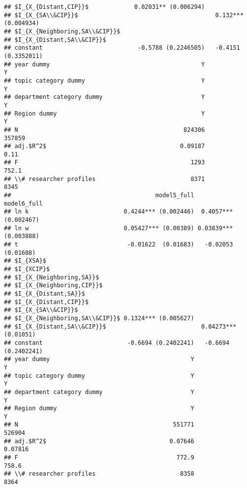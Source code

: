 \documentclass[
]{article}
\begin{document}
\begin{verbatim}
## $I_{X_{Distant,CIP}}$             0.02031** (0.006294)                      
## $I_{X_{SA\\&CIP}}$                                       0.132*** (0.004934)
## $I_{X_{Neighboring,SA\\&CIP}}$                                              
## $I_{X_{Distant,SA\\&CIP}}$                                                  
## constant                           -0.5788 (0.2246505)   -0.4151 (0.3352011)
## year dummy                                           Y                     Y
## topic category dummy                                 Y                     Y
## department category dummy                            Y                     Y
## Region dummy                                         Y                     Y
## N                                               824306                357859
## adj.$R^2$                                      0.09187                  0.11
## F                                                 1293                 752.1
## \\# researcher profiles                           8371                  8345
##                                         model5_full           model6_full
## ln k                           0.4244*** (0.002446)  0.4057*** (0.002467)
## ln w                           0.05427*** (0.00389) 0.03839*** (0.003888)
## t                               -0.01622  (0.01683)   -0.02053  (0.01608)
## $I_{XSA}$                                                                
## $I_{XCIP}$                                                               
## $I_{X_{Neighboring,SA}}$                                                 
## $I_{X_{Neighboring,CIP}}$                                                
## $I_{X_{Distant,SA}}$                                                     
## $I_{X_{Distant,CIP}}$                                                    
## $I_{X_{SA\\&CIP}}$                                                       
## $I_{X_{Neighboring,SA\\&CIP}}$ 0.1324*** (0.005627)                      
## $I_{X_{Distant,SA\\&CIP}}$                           0.04273*** (0.01051)
## constant                        -0.6694 (0.2402241)   -0.6694 (0.2402241)
## year dummy                                        Y                     Y
## topic category dummy                              Y                     Y
## department category dummy                         Y                     Y
## Region dummy                                      Y                     Y
## N                                            551771                526904
## adj.$R^2$                                   0.07646               0.07816
## F                                             772.9                 758.6
## \\# researcher profiles                        8358                  8364
\end{verbatim}
\end{document}
